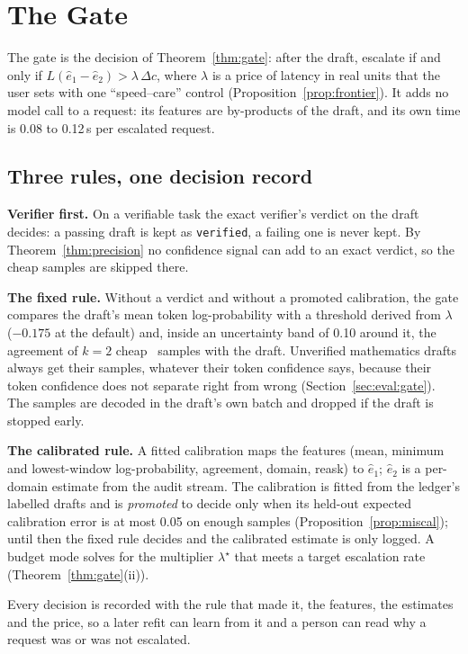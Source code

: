 \section{The Gate}
\label{sec:gate}

The gate is the decision of Theorem~\ref{thm:gate}: after the draft, escalate
if and only if $L(\hat e_1-\hat e_2)>\lambda\,\Delta c$, where $\lambda$ is a
price of latency in real units that the user sets with one ``speed--care''
control (Proposition~\ref{prop:frontier}). It adds no model call to a request:
its features are by-products of the draft, and its own time is 0.08 to
0.12\,s per escalated request.

\subsection{Three rules, one decision record}
\label{sec:gate:rules}
\textbf{Verifier first.} On a verifiable task the exact verifier's verdict on
the draft decides: a passing draft is kept as \texttt{verified}, a failing one
is never kept. By Theorem~\ref{thm:precision} no confidence signal can add to
an exact verdict, so the cheap samples are skipped there.

\textbf{The fixed rule.} Without a verdict and without a promoted calibration,
the gate compares the draft's mean token log-probability with a threshold
derived from $\lambda$ ($-0.175$ at the default) and, inside an uncertainty
band of 0.10 around it, the agreement of $k=2$ cheap \Sone\ samples with the
draft. Unverified mathematics drafts always get their samples, whatever their
token confidence says, because their token confidence does not separate right
from wrong (Section~\ref{sec:eval:gate}). The samples are decoded in the
draft's own batch and dropped if the draft is stopped early.

\textbf{The calibrated rule.} A fitted calibration maps the features (mean,
minimum and lowest-window log-probability, agreement, domain, reask) to
$\hat e_1$; $\hat e_2$ is a per-domain estimate from the audit
stream. The calibration is fitted from the ledger's labelled drafts and is
\emph{promoted} to decide only when its held-out expected calibration error is
at most 0.05 on enough samples (Proposition~\ref{prop:miscal}); until then the
fixed rule decides and the calibrated estimate is only logged. A budget mode
solves for the multiplier $\lambda^\star$ that meets a target escalation rate
(Theorem~\ref{thm:gate}(ii)).

Every decision is recorded with the rule that made it, the features, the
estimates and the price, so a later refit can learn from it and a person can
read why a request was or was not escalated.

